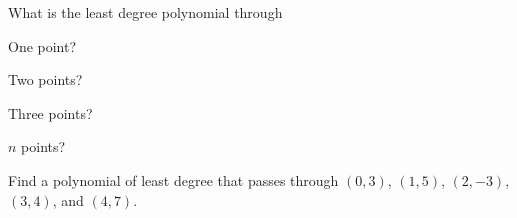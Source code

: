 \documentclass[../gatm_answers.tex]{subfiles}
\begin{document}
\begin{inner_problem}[start=1]
\item What is the least degree polynomial through%
\end{inner_problem}

\begin{iinner_problem}[start=1]
\item One point?
\end{iinner_problem}

\begin{iinner_problem}
\item Two points?
\end{iinner_problem}

\begin{iinner_problem}
\item Three points?
\end{iinner_problem}

\begin{iinner_problem}
\item $n$ points?
\end{iinner_problem}

\begin{outer_problem}
\item Find a polynomial of least degree that passes through $(0,3)$, $(1,5)$, $(2,-3)$, $(3,4)$, and $(4,7)$.
\end{outer_problem}
\end{document}
